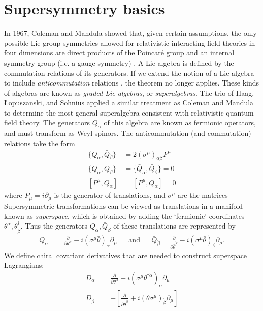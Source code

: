 \section{Supersymmetry basics}
In 1967, Coleman and Mandula \citep{Coleman1967} showed that, given certain assumptions, the only possible Lie group symmetries allowed for relativistic interacting field theories in four dimensions are direct products of the Poincar\'e group and an internal symmetry group (i.e. a gauge symmetry) \citep{Mandula2015}.
A Lie algebra is defined by the commutation relations of its generators. If we extend the notion of a Lie algebra to include \emph{anticommutation} relations \citep{Wess1992}, the theorem no longer applies. These kinds of algebras are known as \emph{graded Lie algebras}, or \emph{superalgebras}. The trio of Haag, Łopuszanski, and Sohnius \citep{Haag1975} applied a similar treatment as Coleman and Mandula to determine the most general superalgebra consistent with relativistic quantum field theory. The generators $Q_\alpha$ of this algebra are known as fermionic operators, and must transform as Weyl spinors. The anticommutation (and commutation) relations take the form
\begin{align*}
  \{Q_\alpha, \bar{Q}_{\dot{\beta}}\} &= 2(\sigma^\mu)_{\alpha\dot{\beta}}P^\mu\\
  \{Q_\alpha, Q_\beta\} &= \{\bar{Q}_{\dot{\alpha}}, \bar{Q}_{\dot{\beta}}\} = 0\\
  [P^\mu,Q_\alpha] &= [P^\mu,\bar{Q}_{\dot{\alpha}}] = 0
\end{align*}
where $P_\mu = i\partial_\mu$ is the generator of translations, and $\sigma^\mu$ are the matrices
Supersymmetric transformations can be viewed as translations in a manifold known as \emph{superspace}, which is obtained by adding the `fermionic' coordinates $\theta^\alpha, \theta^\dagger_{\dot{\beta}}$. Thus the generators $Q_\alpha, \bar{Q}_{\dot{\beta}}$ of these translations are represented by
\begin{align*}
  Q_\alpha &= \frac{\partial}{\partial\theta^\alpha}-i(\sigma^\mu\bar{\theta})_\alpha\partial_\mu&&\text{and}&&
  \bar{Q}_{\dot{\beta}} = \frac{\partial}{\partial\bar{\theta}^{\dot{\beta}}}-i(\sigma^\mu\bar{\theta})_\beta\partial_\mu.
\end{align*}
We define chiral covariant derivatives that are needed to construct superspace Lagrangians:
\begin{align*}
  D_\alpha &= \frac{\partial}{\partial\theta^\alpha}+i(\sigma^\mu\theta^{\dagger\dot{\alpha}})_\alpha\partial_\mu\\
  \bar{D}_{\dot{\beta}} &= -\left[\frac{\partial}{\partial\bar{\theta}^{\dot{\beta}}}+i(\theta\sigma^\mu)_{\dot{\beta}}\partial_\mu\right]
\end{align*}
